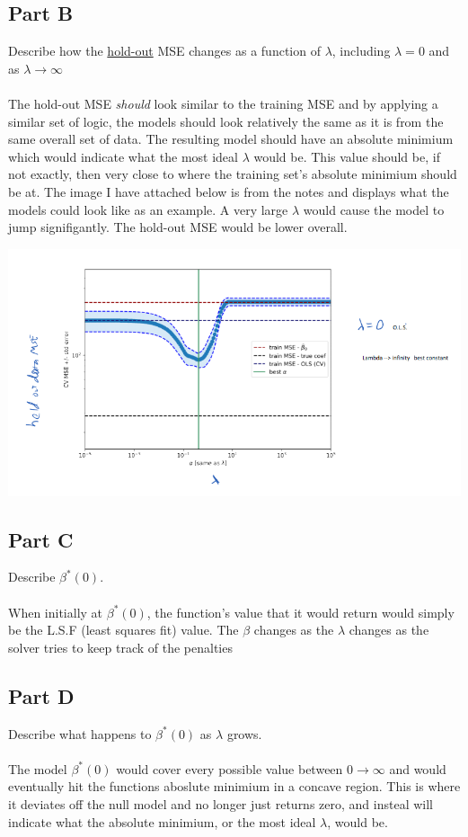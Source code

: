 \documentclass[12pt]{article}
\begin{document}
\subsection{Part B}
Describe how the \underline{hold-out} MSE changes as a function of $\lambda$, including $\lambda = 0$ and as $\lambda \rightarrow \infty$\\\\
The hold-out MSE \emph{should} look similar to the training MSE and by applying a similar set of logic, the models should look relatively the same as it is from the same overall set of data. The resulting model should have an absolute minimium which would indicate what the most ideal $\lambda$ would be. This value should be, if not exactly, then very close to where the training set's absolute minimium should be at. The image I have attached below is from the notes and displays what the models could look like as an example. A very large $\lambda$ would cause the model to jump signifigantly. The hold-out MSE would be lower overall.
\begin{center}\includegraphics[width=1\textwidth]{p1.b.png}\end{center}

\subsection{Part C}
Describe $\beta^*(0)$.\\\\
When initially at $\beta^*(0)$, the function's value that it would return would simply be the L.S.F (least squares fit) value. The $\beta$ changes as the $\lambda$ changes as the solver tries to keep track of the penalties

\subsection{Part D}
Describe what happens to $\beta^*(0)$ as $\lambda$ grows.\\\\
The model $\beta^*(0)$ would cover every possible value between $0\rightarrow\infty$ and would eventually hit the functions aboslute minimium in a concave region. This is where it deviates off the null model and no longer just returns zero, and insteal will indicate what the absolute minimium, or the most ideal $\lambda$, would be.
\end{document}
